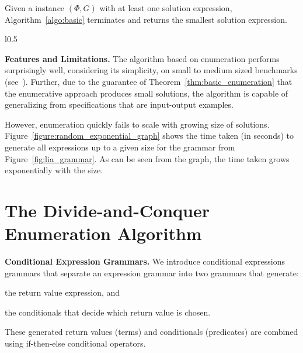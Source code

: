 \documentclass{llncs}
\newcommand\Spec{\Phi}
\newcommand\Grammar{G}
\newcommand{\sygus}{{\sffamily\fontsize{8.5}{10}\selectfont
    SyGuS}\xspace}
\renewcommand{\paragraph}[1]{\par\noindent\textbf{#1.}}
\begin{document}
\begin{theorem}
  \label{thm:basic_enumeration}
  Given a {\upshape\sygus} instance $(\Spec, \Grammar)$ with at least one solution
  expression, Algorithm~\ref{algo:basic} terminates and returns the
  smallest solution expression.
\end{theorem}

\begin{wrapfigure}{l}{0.5\textwidth}
\centering
{}
\caption{Scalability of Enumeration}
\label{figure:random_exponential_graph}
\end{wrapfigure}
\paragraph{Features and Limitations}
The algorithm based on enumeration performs surprisingly well, considering its
simplicity, on small to medium sized benchmarks
(see~\cite{udupa-transit,udupa-sygus}).
Further, due to the guarantee of Theorem~\ref{thm:basic_enumeration}
that the enumerative approach produces small solutions, the algorithm is
capable of generalizing from specifications that are input-output
examples.

However, enumeration quickly fails to scale with growing size of
solutions.
Figure~\ref{figure:random_exponential_graph} shows the time taken (in seconds) to
generate all expressions up to a given size for the grammar
from Figure~\ref{fig:lia_grammar}.
As can be seen from the graph, the time taken grows exponentially with
the size.


\vspace*{-2ex}
\section{The Divide-and-Conquer Enumeration Algorithm}
\label{sec:algo}


\paragraph{Conditional Expression Grammars}
We introduce conditional expressions grammars that separate an
expression grammar into two grammars that generate:
\begin{inparaenum}[(a)]
\item the return value expression, and
\item the conditionals that decide which return value is chosen.
\end{inparaenum}
These generated return values (terms) and conditionals (predicates) are
combined using if-then-else conditional operators.
\end{document}
